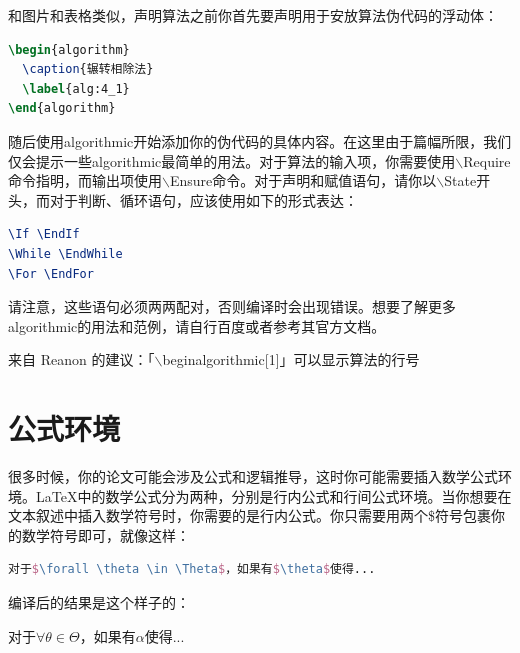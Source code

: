 和图片和表格类似，声明算法之前你首先要声明用于安放算法伪代码的浮动体：

\begin{tcolorbox}
\begin{lstlisting}[language=TeX]
\begin{algorithm}
  \caption{辗转相除法}
  \label{alg:4_1}
\end{algorithm}
\end{lstlisting}
\end{tcolorbox}

\noindent 随后使用{\codefont algorithmic}开始添加你的伪代码的具体内容。在这里由于篇幅所限，我们仅会提示一些{\codefont algorithmic}最简单的用法。对于算法的输入项，你需要使用{\codefont $\backslash$Require}命令指明，而输出项使用{\codefont $\backslash$Ensure}命令。对于声明和赋值语句，请你以{\codefont $\backslash$State}开头，而对于判断、循环语句，应该使用如下的形式表达：

\begin{tcolorbox}
\begin{lstlisting}[language=TeX]
\If \EndIf
\While \EndWhile
\For \EndFor
\end{lstlisting}
\end{tcolorbox}

\noindent 请注意，这些语句必须两两配对，否则编译时会出现错误。想要了解更多{\codefont algorithmic}的用法和范例，请自行百度或者参考其官方文档。

来自 Reanon 的建议：「$\backslash$begin{algorithmic}[1]」可以显示算法的行号

\section{公式环境}

很多时候，你的论文可能会涉及公式和逻辑推导，这时你可能需要插入数学公式环境。\LaTeX 中的数学公式分为两种，分别是行内公式和行间公式环境。当你想要在文本叙述中插入数学符号时，你需要的是行内公式。你只需要用两个\$符号包裹你的数学符号即可，就像这样：

\begin{tcolorbox}
\begin{lstlisting}[language=TeX]
对于$\forall \theta \in \Theta$，如果有$\theta$使得...
\end{lstlisting}
\end{tcolorbox}

\noindent 编译后的结果是这个样子的：

对于$\forall \theta \in \Theta$，如果有$\alpha$使得...

